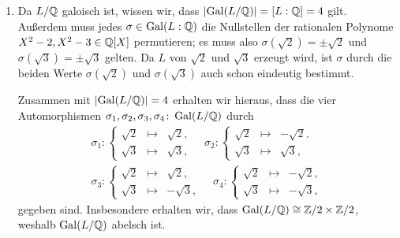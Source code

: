 \begin{solution}
\begin{enumerate}
    \item
      Da $L/\mathbb{Q}$ galoisch ist, wissen wir, dass $|{\operatorname{Gal}(L / \mathbb{Q})}| = [L : \mathbb{Q}] = 4$ gilt.
      Außerdem muss jedes $\sigma \in \operatorname{Gal}(L : \mathbb{Q})$ die Nullstellen der rationalen Polynome $X^2 - 2, X^2 - 3 \in \mathbb{Q}[X]$ permutieren;
      es muss also $\sigma(\sqrt{2}) = \pm \sqrt{2}$ und $\sigma(\sqrt{3}) = \pm \sqrt{3}$ gelten.
      Da $L$ von $\sqrt{2}$ und $\sqrt{3}$ erzeugt wird, ist $\sigma$ durch die beiden Werte $\sigma(\sqrt{2})$ und $\sigma(\sqrt{3})$ auch schon eindeutig bestimmt.
      
      Zusammen mit $|{\operatorname{Gal}(L / \mathbb{Q})}| = 4$ erhalten wir hieraus, dass die vier Automorphismen $\sigma_1, \sigma_2, \sigma_3, \sigma_4 \colon \operatorname{Gal}(L / \mathbb{Q})$ durch
      \begin{gather*}
        \sigma_1 \colon
        \left\{
          \begin{array}{ccr}
            \sqrt{2} & \mapsto  & \sqrt{2}, \\
            \sqrt{3} & \mapsto  & \sqrt{3},
          \end{array}
        \right.
        \quad
        \sigma_2 \colon
        \left\{
          \begin{array}{ccr}
            \sqrt{2} & \mapsto  & -\sqrt{2},  \\
            \sqrt{3} & \mapsto  &  \sqrt{3},
          \end{array}
        \right.
        \\
        \sigma_3 \colon
        \left\{
          \begin{array}{ccr}
            \sqrt{2} & \mapsto  &  \sqrt{2},  \\
            \sqrt{3} & \mapsto  & -\sqrt{3},
          \end{array}
        \right.
        \quad
        \sigma_4 \colon
        \left\{
          \begin{array}{ccr}
            \sqrt{2} & \mapsto  & -\sqrt{2},  \\
            \sqrt{3} & \mapsto  & -\sqrt{3},
          \end{array}
        \right.
      \end{gather*}
      gegeben sind.
      Insbesondere erhalten wir, dass $\operatorname{Gal}(L / \mathbb{Q}) \cong \mathbb{Z}/2 \times \mathbb{Z}/2$,
      weshalb $\operatorname{Gal}(L / \mathbb{Q})$ abelsch ist.
  \end{enumerate}
\end{solution}



